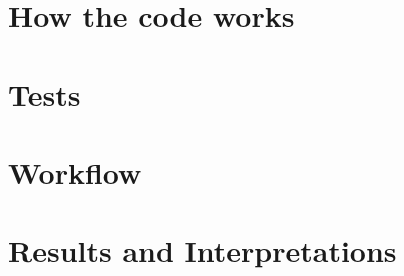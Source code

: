 \documentclass[11pt, letterpaper, onecolumn]{article}
\begin{document}
    
    
    
    
    \section{How the code works}








    

    \section{Tests}



















    \section{Workflow}















    
\section{Results and Interpretations}
\end{document}
